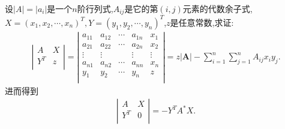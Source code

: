 \documentclass[../../main.tex]{subfiles}%
\begin{document}
\begin{proposition}\label{根据行列式代数余子式构造行列式}
设\(\vert A\vert=\vert a_{i}\vert\)是一个\(n\)阶行列式,\(A_{ij}\)是它的第\((i,j)\)元素的代数余子式,$X=(x_1,x_2,\cdots,x_n)^T,Y=(y_1,y_2,\cdots,y_n)^T$,$z$是任意常数,求证:
\begin{gather*}
\left| \begin{matrix}
A&		X\\
Y^T&		z\\
\end{matrix} \right|=\left| \begin{matrix}
a_{11}&		a_{12}&		\cdots&		a_{1n}&		x_1\\
a_{21}&		a_{22}&		\cdots&		a_{2n}&		x_2\\
\vdots&		\vdots&		&		\vdots&		\vdots\\
a_{n1}&		a_{n2}&		\cdots&		a_{nn}&		x_n\\
y_1&		y_2&		\cdots&		y_n&		z\\
\end{matrix} \right|=z|\boldsymbol{A}|-\sum_{i=1}^n{\sum_{j=1}^n{A_{ij}x_iy_j}.}
\end{gather*}
进而得到
\begin{align*}
\left| \begin{matrix}
A&		X\\
Y^T&		0\\
\end{matrix} \right|=-Y^TA^*X.
\end{align*}
\end{proposition}
\end{document}
